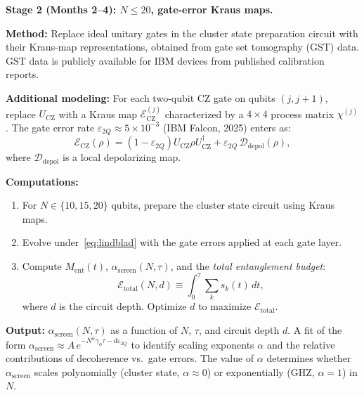 \documentclass[12pt,letterpaper]{article}
\theoremstyle{plain}
\theoremstyle{definition}
\theoremstyle{remark}
\newcommand{\asc}{\alpha_{\mathrm{screen}}}
\begin{document}
\begin{opbox}
\textbf{Stage 2 (Months 2--4): $N \leq 20$, gate-error Kraus maps.}

\textbf{Method:} Replace ideal unitary gates in the cluster state preparation circuit with their Kraus-map representations, obtained from gate set tomography (GST) data. GST data is publicly available for IBM devices from published calibration reports.

\textbf{Additional modeling:} For each two-qubit CZ gate on qubits $(j,j+1)$, replace $U_{\mathrm{CZ}}$ with a Kraus map $\mathcal{E}_{\mathrm{CZ}}^{(j)}$ characterized by a $4\times 4$ process matrix $\chi^{(j)}$. The gate error rate $\varepsilon_{2Q} \approx 5\times10^{-3}$ (IBM Falcon, 2025) enters as:
\begin{equation}
  \mathcal{E}_{\mathrm{CZ}}(\rho) = (1-\varepsilon_{2Q})U_{\mathrm{CZ}}\rho U_{\mathrm{CZ}}^\dagger
  + \varepsilon_{2Q}\,\mathcal{D}_{\mathrm{depol}}(\rho),
  \label{eq:kraus}
\end{equation}
where $\mathcal{D}_{\mathrm{depol}}$ is a local depolarizing map.

\textbf{Computations:}
\begin{enumerate}
\item For $N \in \{10, 15, 20\}$ qubits, prepare the cluster state circuit using Kraus maps.
\item Evolve under~\eqref{eq:lindblad} with the gate errors applied at each gate layer.
\item Compute $M_{\mathrm{ent}}(t)$, $\asc(N,\tau)$, and the \emph{total entanglement budget}:
\begin{equation}
  \mathcal{E}_{\mathrm{total}}(N,d) \equiv \int_0^\tau \sum_k s_k(t)\,dt,
\end{equation}
where $d$ is the circuit depth. Optimize $d$ to maximize $\mathcal{E}_{\mathrm{total}}$.
\end{enumerate}

\textbf{Output:} $\asc(N,\tau)$ as a function of $N$, $\tau$, and circuit depth $d$. A fit of the form $\asc \approx A\,e^{-N^\alpha\gamma_\phi\tau - d\varepsilon_{2Q}}$ to identify scaling exponents $\alpha$ and the relative contributions of decoherence vs.\ gate errors. The value of $\alpha$ determines whether $\asc$ scales polynomially (cluster state, $\alpha \approx 0$) or exponentially (GHZ, $\alpha = 1$) in $N$.
\end{opbox}
\end{document}
